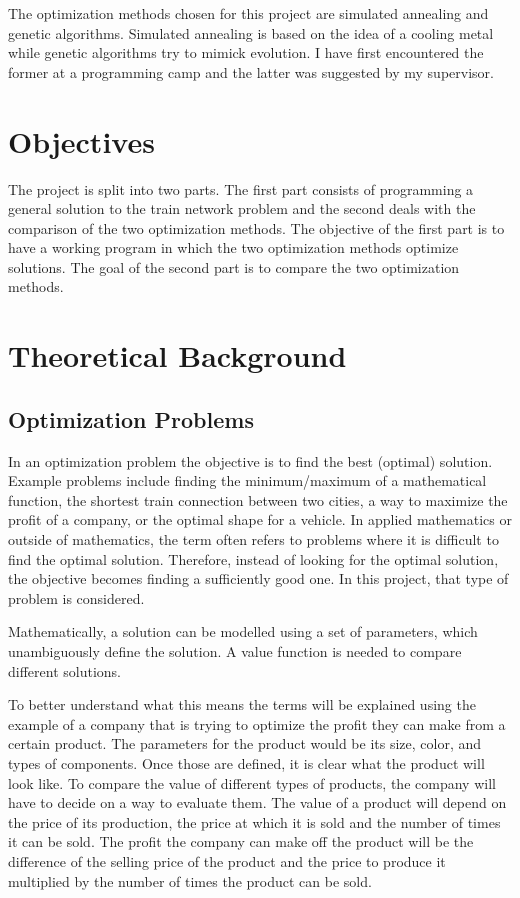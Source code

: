 \documentclass[10pt]{scrreprt}
\begin{document}

The optimization methods chosen for this project are simulated annealing and genetic algorithms. Simulated annealing is based on the idea of a cooling metal while genetic algorithms try to mimick evolution. I have first encountered the former at a programming camp and the latter was suggested by my supervisor.

\chapter{Objectives}

The project is split into two parts. The first part consists of programming a general solution to the train network problem and the second deals with the comparison of the two optimization methods. The objective of the first part is to have a working program in which the two optimization methods optimize solutions. The goal of the second part is to compare the two optimization methods.


\chapter{Theoretical Background}

\section{Optimization Problems}
In an optimization problem the objective is to find the best (optimal) solution. Example problems include finding the minimum/maximum of a mathematical function, the shortest train connection between two cities, a way to maximize the profit of a company, or the optimal shape for a vehicle. In applied mathematics or outside of mathematics, the term often refers to problems where it is difficult to find the optimal solution. Therefore, instead of looking for the optimal solution, the objective becomes finding a sufficiently good one. In this project, that type of problem is considered.

Mathematically, a solution can be modelled using a set of parameters, which unambiguously define the solution. A value function is needed to compare different solutions. 

To better understand what this means the terms will be explained using the example of a company that is trying to optimize the profit they can make from a certain product. The parameters for the product would be its size, color, and types of components. Once those are defined, it is clear what the product will look like. To compare the value of different types of products, the company will have to decide on a way to evaluate them. The value of a product will depend on the price of its production, the price at which it is sold and the number of times it can be sold. The profit the company can make off the product will be the difference of the selling price of the product and the price to produce it multiplied by the number of times the product can be sold.
\end{document}

